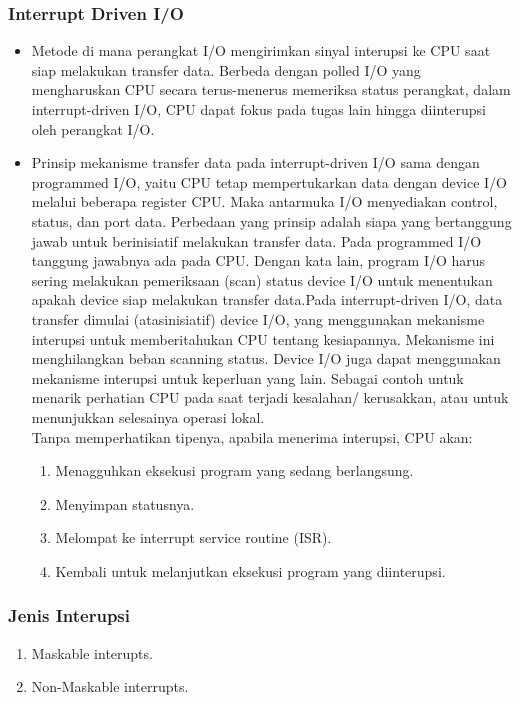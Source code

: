 \documentclass[12pt]{article}
\begin{document}
\subsubsection{Interrupt Driven I/O}
   \begin{itemize}
    \item Metode di mana perangkat I/O mengirimkan sinyal interupsi ke CPU
    saat siap melakukan transfer data. Berbeda dengan polled I/O yang mengharuskan CPU secara terus-menerus memeriksa status perangkat, dalam interrupt-driven I/O, CPU dapat fokus pada tugas lain hingga diinterupsi oleh perangkat I/O.
    \item Prinsip mekanisme transfer data pada interrupt-driven I/O sama dengan programmed I/O, yaitu CPU tetap mempertukarkan data dengan device I/O melalui beberapa register CPU. Maka antarmuka I/O menyediakan control, status, dan port data. Perbedaan yang prinsip adalah siapa yang bertanggung jawab untuk berinisiatif melakukan transfer data. Pada programmed I/O tanggung jawabnya ada pada CPU. Dengan kata lain, program I/O harus sering melakukan pemeriksaan (scan) status device I/O untuk menentukan apakah device siap melakukan transfer data.Pada interrupt-driven I/O, data transfer dimulai (atasinisiatif) device I/O, yang menggunakan mekanisme interupsi untuk memberitahukan CPU tentang kesiapannya. Mekanisme ini menghilangkan beban scanning status. Device I/O juga dapat menggunakan mekanisme interupsi untuk keperluan yang lain. Sebagai contoh untuk menarik perhatian CPU pada saat terjadi kesalahan/ kerusakkan, atau untuk menunjukkan selesainya operasi lokal.\\
    Tanpa memperhatikan tipenya, apabila menerima interupsi, CPU akan:
\begin{enumerate}
    \item Menagguhkan eksekusi program yang sedang berlangsung.
    \item Menyimpan statusnya.
    \item Melompat ke interrupt service routine (ISR).
    \item Kembali untuk melanjutkan eksekusi program yang diinterupsi.
\end{enumerate}
\end{itemize}
\subsubsection{Jenis Interupsi}
\begin{enumerate}
    \item Maskable interupts.
    \item Non-Maskable interrupts.
\end{enumerate}
\end{document}
